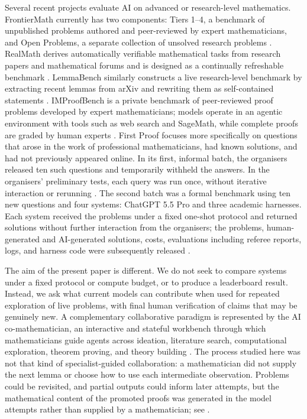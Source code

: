 \documentclass[11pt,reqno]{amsart}
\theoremstyle{plain}
\theoremstyle{definition}
\begin{document}
Several recent projects evaluate AI on advanced or research-level mathematics. FrontierMath currently has two components: Tiers 1--4, a benchmark of unpublished problems authored and peer-reviewed by expert mathematicians, and Open Problems, a separate collection of unsolved research problems \cite{GlazerEtAl2024FrontierMath,EpochAIFrontierMath}. RealMath derives automatically verifiable mathematical tasks from research papers and mathematical forums and is designed as a continually refreshable benchmark \cite{ZhangEtAl2025RealMath}. LemmaBench similarly constructs a live research-level benchmark by extracting recent lemmas from arXiv and rewriting them as self-contained statements \cite{PeyronnetEtAl2026LemmaBench}. IMProofBench is a private benchmark of peer-reviewed proof problems developed by expert mathematicians; models operate in an agentic environment with tools such as web search and SageMath, while complete proofs are graded by human experts \cite{SchmittEtAl2025IMProofBench}. First Proof focuses more specifically on questions that arose in the work of professional mathematicians, had known solutions, and had not previously appeared online. In its first, informal batch, the organisers released ten such questions and temporarily withheld the answers. In the organisers' preliminary tests, each query was run once, without iterative interaction or rerunning \cite{AbouzaidEtAl2026FirstProofFirstBatch}. The second batch was a formal benchmark using ten new questions and four systems: ChatGPT 5.5 Pro and three academic harnesses. Each system received the problems under a fixed one-shot protocol and returned solutions without further interaction from the organisers; the problems, human-generated and AI-generated solutions, costs, evaluations including referee reports, logs, and harness code were subsequently released \cite{AbouzaidEtAl2026FirstProofSecondBatch}.

The aim of the present paper is different. We do not seek to compare systems under a fixed protocol or compute budget, or to produce a leaderboard result. Instead, we ask what current models can contribute when used for repeated exploration of live problems, with final human verification of claims that may be genuinely new. A complementary collaborative paradigm is represented by the AI co-mathematician, an interactive and stateful workbench through which mathematicians guide agents across ideation, literature search, computational exploration, theorem proving, and theory building \cite{ZhengEtAl2026AICoMathematician}. The process studied here was not that kind of specialist-guided collaboration: a mathematician did not supply the next lemma or choose how to use each intermediate observation. Problems could be revisited, and partial outputs could inform later attempts, but the mathematical content of the promoted proofs was generated in the model attempts rather than supplied by a mathematician; see .
\end{document}
